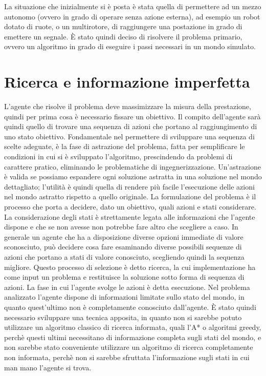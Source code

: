 La situazione che inizialmente si è posta è stata quella di permettere ad un mezzo autonomo (ovvero in grado di operare senza azione esterna), ad esempio un robot dotato di ruote, o un multirotore, di raggiungere una postazione in grado di emettere un segnale. È stato quindi deciso di risolvere il problema primario, ovvero un algoritmo in grado di eseguire i passi necessari in un mondo simulato.




\section{Ricerca e informazione imperfetta}
L'agente che risolve il problema deve massimizzare la misura della prestazione, quindi per prima cosa è necessario fissare un obiettivo. Il compito dell'agente sarà quindi quello di trovare una sequenza di azioni che portano al raggiungimento di uno stato obiettivo. Fondamentale nel permettere di sviluppare una sequenza di scelte adeguate, è la fase di astrazione del problema, fatta per semplificare le condizioni in cui si è sviluppato l'algoritmo, prescindendo da problemi di carattere pratico, eliminando le problematiche di ingegnerizzazione. Un'astrazione è valida se possiamo espandere ogni soluzione astratta in una soluzione nel mondo dettagliato; l'utilità è quindi quella di rendere più facile l'esecuzione delle azioni nel mondo astratto rispetto a quello originale. 
La formulazione del problema è il processo che porta a decidere, dato un obiettivo, quali azioni e stati considerare. La considerazione degli stati è strettamente legata alle informazioni che l'agente dispone e che se non avesse non potrebbe fare altro che scegliere a caso. In generale un agente che ha a disposizione diverse opzioni immediate di valore sconosciuto, può decidere cosa fare esaminando diverse possibili sequenze di azioni che portano a stati di valore conosciuto, scegliendo quindi la sequenza migliore. Questo processo di selezione è detto ricerca, la cui implementazione ha come input un problema e restituisce la soluzione sotto forma di sequenza di azioni. La fase in cui l'agente svolge le azioni è detta esecuzione.
Nel problema analizzato l'agente dispone di informazioni limitate sullo stato del mondo, in quanto quest'ultimo non è completamente conosciuto dall'agente. È stato quindi necessario sviluppare una tecnica apposita, in quanto non si sarebbe potuto utilizzare un algoritmo classico di ricerca informata, quali l'A* o algoritmi greedy, perchè questi ultimi necessitano di informazione completa sugli stati del mondo, e non sarebbe stato conveniente utilizzare un algoritmo di ricerca completamente non informata, perchè non si sarebbe sfruttata l'informazione sugli stati in cui man mano l'agente si trova.


